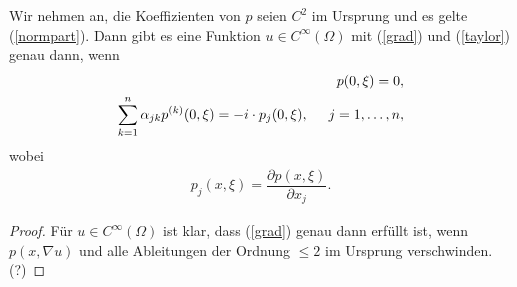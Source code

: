 \begin{lem}
Wir nehmen an, die Koeffizienten von $p$ seien $C^2$ im Ursprung und es gelte (\ref{normpart}). Dann gibt es eine Funktion $u \in C^\infty(\Omega)$ mit (\ref{grad}) und (\ref{taylor}) genau dann, wenn
\begin{align}
p(0, \xi) = 0, \\
\sum_{k=1}^{n} \alpha_{jk}p^{(k)}(0,\xi) = -i \cdot p_j(0,\xi), \hspace{0.5cm} j=1, \ldots, n,
\end{align}
wobei
\begin{align}
p_j(x,\xi) = \dfrac{\partial p(x,\xi)}{\partial x_j}.
\end{align}
\end{lem}

\begin{proof}
Für $u \in C^\infty(\Omega)$ ist klar, dass (\ref{grad}) genau dann erfüllt ist, wenn $p(x, \nabla u)$ und alle Ableitungen der Ordnung $\le 2$ im Ursprung verschwinden. (?)
\end{proof}